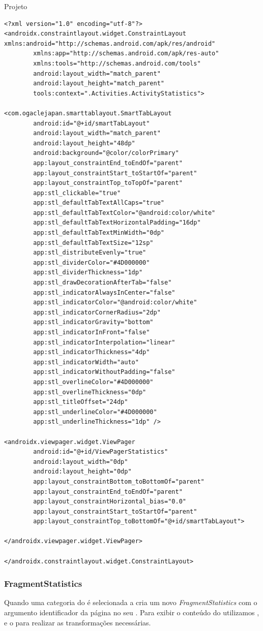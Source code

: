 \documentclass[
	12pt,				%
	openright,			%
	twoside,			%
	a4paper,			%
	english,			%
	french,				%
	spanish,			%
	brazil				%
	]{abntex2}
\begin{document}
\begin{chapter}{Projeto}
\begin{lstlisting}[numbers=none,basicstyle=\small,
caption={ActivityStatistics.xml},
title={ActivityStatistics.xml},
label={ActivityStatistics.xml}]
<?xml version="1.0" encoding="utf-8"?>
<androidx.constraintlayout.widget.ConstraintLayout xmlns:android="http://schemas.android.com/apk/res/android"
		xmlns:app="http://schemas.android.com/apk/res-auto"
		xmlns:tools="http://schemas.android.com/tools"
		android:layout_width="match_parent"
		android:layout_height="match_parent"
		tools:context=".Activities.ActivityStatistics">

<com.ogaclejapan.smarttablayout.SmartTabLayout
		android:id="@+id/smartTabLayout"
		android:layout_width="match_parent"
		android:layout_height="48dp"
		android:background="@color/colorPrimary"
		app:layout_constraintEnd_toEndOf="parent"
		app:layout_constraintStart_toStartOf="parent"
		app:layout_constraintTop_toTopOf="parent"
		app:stl_clickable="true"
		app:stl_defaultTabTextAllCaps="true"
		app:stl_defaultTabTextColor="@android:color/white"
		app:stl_defaultTabTextHorizontalPadding="16dp"
		app:stl_defaultTabTextMinWidth="0dp"
		app:stl_defaultTabTextSize="12sp"
		app:stl_distributeEvenly="true"
		app:stl_dividerColor="#4D000000"
		app:stl_dividerThickness="1dp"
		app:stl_drawDecorationAfterTab="false"
		app:stl_indicatorAlwaysInCenter="false"
		app:stl_indicatorColor="@android:color/white"
		app:stl_indicatorCornerRadius="2dp"
		app:stl_indicatorGravity="bottom"
		app:stl_indicatorInFront="false"
		app:stl_indicatorInterpolation="linear"
		app:stl_indicatorThickness="4dp"
		app:stl_indicatorWidth="auto"
		app:stl_indicatorWithoutPadding="false"
		app:stl_overlineColor="#4D000000"
		app:stl_overlineThickness="0dp"
		app:stl_titleOffset="24dp"
		app:stl_underlineColor="#4D000000"
		app:stl_underlineThickness="1dp" />

<androidx.viewpager.widget.ViewPager
		android:id="@+id/ViewPagerStatistics"
		android:layout_width="0dp"
		android:layout_height="0dp"
		app:layout_constraintBottom_toBottomOf="parent"
		app:layout_constraintEnd_toEndOf="parent"
		app:layout_constraintHorizontal_bias="0.0"
		app:layout_constraintStart_toStartOf="parent"
		app:layout_constraintTop_toBottomOf="@+id/smartTabLayout">

</androidx.viewpager.widget.ViewPager>

</androidx.constraintlayout.widget.ConstraintLayout>
\end{lstlisting}

\newpage
\subsubsection{FragmentStatistics} \label{FragmentStatistics}
Quando uma categoria do  é selecionada a  cria um novo \textit{FragmentStatistics} com o argumento identificador da página no seu .
Para exibir o conteúdo do  utilizamos ,  e o  para realizar as transformações necessárias.
  


\end{chapter}
\end{document}
